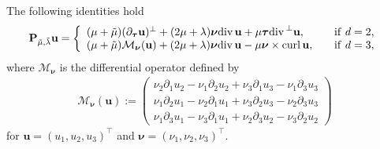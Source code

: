 \documentclass[final,reqno]{siamltex}
\newcommand{\pa}{\partial}
\newcommand{\curl}{{\rm curl\,}}
\newcommand{\dive}{{\rm div\,}}
\begin{document}
\begin{lemma}\label{lem2.1}
	The following identities hold 
	\begin{align*}
	\mathbf{P}_{\tilde\mu,\tilde\lambda}\mathbf{u}=
	\left\{
	\begin{array}{ll}
		(\mu+\tilde{\mu})(\pa_{\boldsymbol{\tau}}\mathbf{u})^\perp+(2\mu+\lambda)\boldsymbol{\nu}\dive\mathbf{u}+\mu\boldsymbol{\tau}\dive^\perp\mathbf{u},~~~&{\rm if}~d=2,\\
		(\mu+\tilde{\mu})\mathcal{M}_{\boldsymbol{\nu}}(\mathbf{u})+(2\mu+\lambda)\boldsymbol{\nu}\dive\mathbf{u}-\mu\boldsymbol{\nu}\times\curl\mathbf{u},~~~&{\rm if}~d=3, 
	\end{array}
	\right.
	\end{align*}
	where $\mathcal{M}_{\boldsymbol{\nu}}$ is the differential operator defined by 
	\begin{align*}
	  \mathcal{M}_{\boldsymbol{\nu}}(\mathbf{u}):=
	  \left(
	  \begin{array}{l}
	  	\nu_2\pa_1u_2-\nu_1\pa_2u_2+\nu_3\pa_1u_3-\nu_1\pa_3u_3 \\
	  	\nu_1\pa_2u_1-\nu_2\pa_1u_1+\nu_3\pa_2u_3-\nu_2\pa_3u_3 \\
	  	\nu_1\pa_3u_1-\nu_3\pa_1u_1+\nu_2\pa_3u_2-\nu_3\pa_2u_2
	  \end{array}
	  \right)
	\end{align*}
	for $\mathbf{u}=(u_1,u_2,u_3)^\top$ and $\boldsymbol{\nu}=(\nu_1,\nu_2,\nu_3)^\top$. 
\end{lemma}
\end{document}
